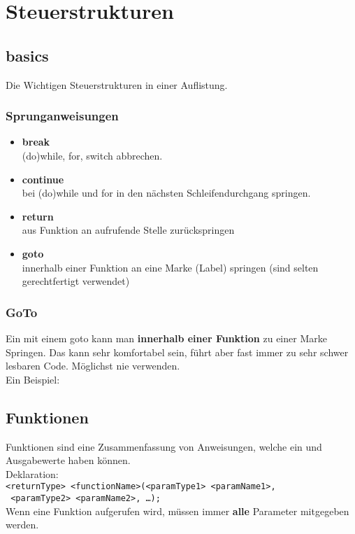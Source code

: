 \newpage
\section{Steuerstrukturen}

\subsection{basics}

Die Wichtigen Steuerstrukturen in einer Auflistung.



\subsubsection{Sprunganweisungen}

\begin{itemize}[itemsep=1pt, parsep=0pt]
    \item \textbf{break} \\ (do)while, for, switch abbrechen.
    \item \textbf{continue} \\ bei (do)while und for in den nächsten Schleifendurchgang springen.
    \item \textbf{return} \\ aus Funktion an aufrufende Stelle zurückspringen
    \item \textbf{goto} \\ innerhalb einer Funktion an eine Marke (Label) springen (sind selten gerechtfertigt verwendet)
\end{itemize}

\subsubsection{GoTo}

Ein mit einem goto kann man \textbf{innerhalb einer Funktion} zu einer Marke Springen. Das kann sehr komfortabel sein, führt aber fast immer zu sehr schwer lesbaren Code. Möglichst nie verwenden.\\
Ein Beispiel:



\subsection{Funktionen}

Funktionen sind eine Zusammenfassung von Anweisungen, welche ein und Ausgabewerte haben können.\\
Deklaration:\\
\verb|<returnType> <functionName>(<paramType1> <paramName1>,|\\
\verb| <paramType2> <paramName2>, …);|\\
Wenn eine Funktion aufgerufen wird, müssen immer \textbf{alle} Parameter mitgegeben werden.\\

